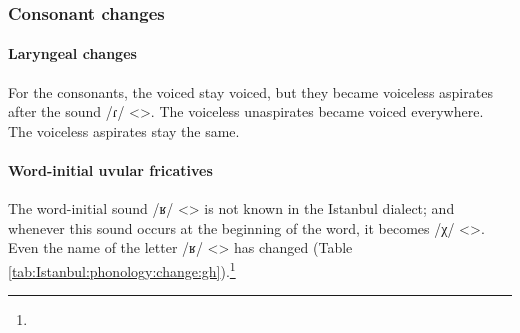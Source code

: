 \begin{table}[H]
	\centering 
	\caption{Splitting of Classical Armenian diphthongs to vowel + glide sequences in the Istanbul dialect}
	\label{tab:Istanbul:phonology:change:dipthGl}
\end{table}


\subsubsection{Consonant changes}
\paragraph{Laryngeal changes}\label{sec:Istanbul:phono:soundchange:cons:laryngeal}

For the consonants, the voiced stay voiced, but they became voiceless aspirates after the sound /ɾ/ <>. The voiceless unaspirates became voiced everywhere. The voiceless aspirates stay the same. 

\paragraph{Word-initial uvular fricatives}

The word-initial sound /ʁ/ <> is not known in the Istanbul dialect; and whenever this sound occurs at the beginning of the word, it becomes /χ/ <>. Even the name of the letter /ʁ/ <> has changed (Table \ref{tab:Istanbul:phonology:change:gh}).\footnote{ } 


